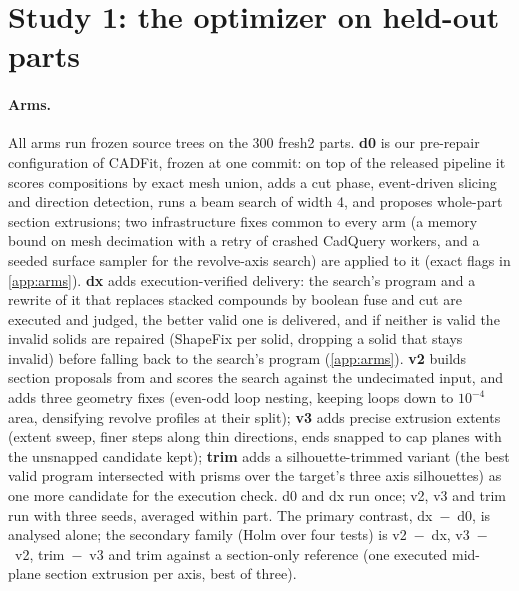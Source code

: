 \section{Study 1: the optimizer on held-out parts}
\label{sec:optimizer}

\paragraph{Arms.} All arms run frozen source trees on the 300 fresh2 parts. \textbf{d0} is our pre-repair configuration of CADFit, frozen at one commit: on top of the released pipeline it scores compositions by exact mesh union, adds a cut phase, event-driven slicing and direction detection, runs a beam search of width 4, and proposes whole-part section extrusions; two infrastructure fixes common to every arm (a memory bound on mesh decimation with a retry of crashed CadQuery workers, and a seeded surface sampler for the revolve-axis search) are applied to it (exact flags in \cref{app:arms}). \textbf{dx} adds execution-verified delivery: the search's program and a rewrite of it that replaces stacked compounds by boolean fuse and cut are executed and judged, the better valid one is delivered, and if neither is valid the invalid solids are repaired (ShapeFix per solid, dropping a solid that stays invalid) before falling back to the search's program (\cref{app:arms}). \textbf{v2} builds section proposals from and scores the search against the undecimated input, and adds three geometry fixes (even-odd loop nesting, keeping loops down to $10^{-4}$ area, densifying revolve profiles at their split); \textbf{v3} adds precise extrusion extents (extent sweep, finer steps along thin directions, ends snapped to cap planes with the unsnapped candidate kept); \textbf{trim} adds a silhouette-trimmed variant (the best valid program intersected with prisms over the target's three axis silhouettes) as one more candidate for the execution check. d0 and dx run once; v2, v3 and trim run with three seeds, averaged within part. The primary contrast, dx~$-$~d0, is analysed alone; the secondary family (Holm over four tests) is v2~$-$~dx, v3~$-$~v2, trim~$-$~v3 and trim against a section-only reference (one executed mid-plane section extrusion per axis, best of three).

